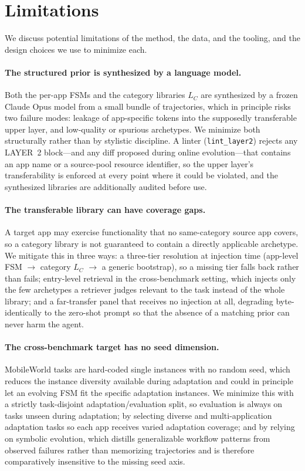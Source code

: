 \section*{Limitations}
\label{sec:limitations}

We discuss potential limitations of the method, the data, and the tooling, and
the design choices we use to minimize each.

\paragraph{The structured prior is synthesized by a language model.}
Both the per-app FSMs and the category libraries $L_C$ are synthesized by a
frozen Claude Opus model from a small bundle of trajectories, which in principle
risks two failure modes: leakage of app-specific tokens into the supposedly
transferable upper layer, and low-quality or spurious archetypes. We minimize
both structurally rather than by stylistic discipline. A linter
(\texttt{lint\_layer2}) rejects any LAYER~2 block---and any diff proposed during
online evolution---that contains an app name or a source-pool resource
identifier, so the upper layer's transferability is enforced at every point where
it could be violated, and the synthesized libraries are additionally audited
before use.

\paragraph{The transferable library can have coverage gaps.}
A target app may exercise functionality that no same-category source app covers,
so a category library is not guaranteed to contain a directly applicable
archetype. We mitigate this in three ways: a three-tier resolution at injection
time (app-level FSM $\to$ category $L_C$ $\to$ a generic bootstrap), so a missing
tier falls back rather than fails; entry-level retrieval in the cross-benchmark
setting, which injects only the few archetypes a retriever judges relevant to the
task instead of the whole library; and a far-transfer panel that receives no
injection at all, degrading byte-identically to the zero-shot prompt so that the
absence of a matching prior can never harm the agent.

\paragraph{The cross-benchmark target has no seed dimension.}
MobileWorld tasks are hard-coded single instances with no random seed, which
reduces the instance diversity available during adaptation and could in principle
let an evolving FSM fit the specific adaptation instances. We minimize this with a
strictly task-disjoint adaptation/evaluation split, so evaluation is always on
tasks unseen during adaptation; by selecting diverse and multi-application
adaptation tasks so each app receives varied adaptation coverage; and by relying
on symbolic evolution, which distills generalizable workflow patterns from
observed failures rather than memorizing trajectories and is therefore
comparatively insensitive to the missing seed axis.

